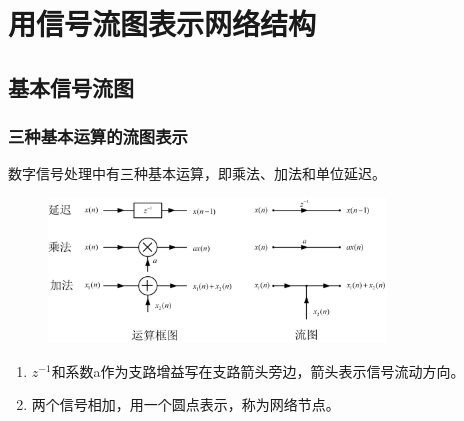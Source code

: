 \documentclass[notheorems,compress,mathserif,table]{beamer}
\begin{document}
\section{用信号流图表示网络结构}

\subsection{基本信号流图}
\begin{frame}[shrink]\frametitle{三种基本运算的流图表示}
数字信号处理中有三种基本运算，即乘法、加法和单位延迟。%
\begin{figure}[h]
  \centering
  \includegraphics[width=0.8\textwidth]{jibenliutu.jpg}
  \label{graph:chp5jibenliutu}
\end{figure}
\begin{enumerate}
  \item $z^{-1}$和系数a作为支路增益写在支路箭头旁边，箭头表示信号流动方向。
  \item 两个信号相加，用一个圆点表示，称为网络节点。
\end{enumerate}
\end{frame}
\end{document}
